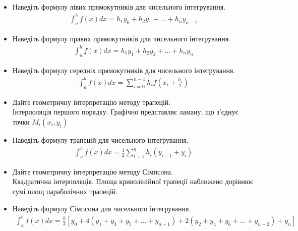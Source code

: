 \begin{itemize}
      \item Наведіть формулу лівих прямокутників для чисельного інтегрування.
            \begin{align}
                  \int_{a}^{b} f(x) dx = h_1 y_0 + h_2 y_1 + \dots + h_n y_{n - 1}
            \end{align}
      \item Наведіть формулу правих прямокутників для чисельного інтегрування.
            \begin{align}
                  \int_{a}^{b} f(x) dx = h_1 y_1 + h_2 y_2 + \dots + h_n y_n
            \end{align}
      \item Наведіть формулу середніх прямокутників для чисельного інтегрування.
            \begin{align}
                  \int_{a}^{b} f(x) dx = \sum_{i = 0}^{n - 1} h_i f(x_i + \frac{h_i}{2})
            \end{align}
      \item Дайте геометричну інтерпретацію методу трапецій. \\
            Інтерполяція першого порядку.
            Графічно представляє ламану, що з'єднує точки $M_i(x_i, y_i)$
      \item Наведіть формулу трапецій для чисельного інтегрування.
            \begin{align}
                  \int_{a}^{b} f(x) dx = \frac{1}{2}
                  \sum_{i = 1}^{n} h_i (y_{i - 1} + y_i)
            \end{align}
      \item Дайте геометричну інтерпретацію методу Сімпсона. \\
            Квадратична інтерполяція.
            Площа криволінійної трапеції наближено дорівнює
            сумі площ параболічних трапецій.
      \item Наведіть формулу Сімпсона для чисельного інтегрування.
            \begin{align}
                  \int_{a}^{b} f(x) dx = \frac{h}{3}
                  [
                        y_0
                        + 4 (y_1 + y_3 + y_5 + \dots + y_{n - 1})
                        + 2 (y_2 + y_4 + y_6 + \dots + y_{n - 2})
                        + y_n
                  ]
            \end{align}
\end{itemize}

